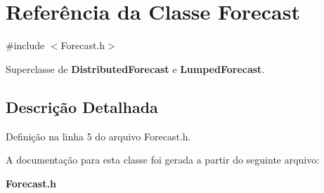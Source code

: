 \section{Referência da Classe Forecast}
\label{class_forecast}


{\ttfamily \#include $<$Forecast.\+h$>$}



Superclasse de {\bf Distributed\+Forecast} e {\bf Lumped\+Forecast}.



\subsection{Descrição Detalhada}


Definição na linha 5 do arquivo Forecast.\+h.



A documentação para esta classe foi gerada a partir do seguinte arquivo\+:\begin{DoxyCompactItemize}
\item 
{\bf Forecast.\+h}\end{DoxyCompactItemize}
